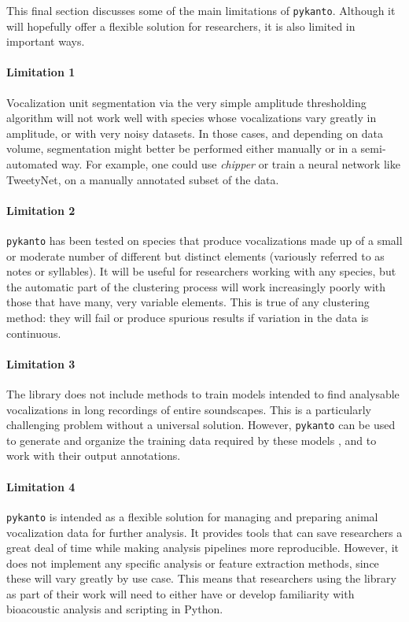 This final section discusses some of the main limitations of \texttt{pykanto}. Although it
will hopefully offer a flexible solution for researchers, it is also limited in
important ways.

\paragraph{Limitation 1} Vocalization unit segmentation via the very simple amplitude
thresholding algorithm will not work well with species whose vocalizations vary
greatly in amplitude, or with very noisy datasets. In those cases, and depending
on data volume,  segmentation might better be performed either manually or in a
semi-automated way. For example, one could use \textit{chipper}
\parencite{searfoss2020a} or train a neural network like TweetyNet,
\parencite{cohen2022} on a manually annotated subset of the data.

\paragraph{Limitation 2} \texttt{pykanto} has been tested on species that produce
vocalizations made up of a small or moderate number of different but distinct
elements (variously referred to as notes or syllables). It will be useful for
researchers working with any species, but the automatic part of the clustering
process will work increasingly poorly with those that have many, very variable elements. This is true of any clustering method: they will fail or
produce spurious results if variation in the data is continuous.

\paragraph{Limitation 3} The library does not include methods to train models intended to
find analysable vocalizations in long recordings of entire soundscapes. This is
a particularly challenging problem \parencite{priyadarshani2018} without a universal
solution. However, \texttt{pykanto} can be used to generate and organize the training
data required by these models \parencite{kahl2021, stowell2019, stowell2014}, and to
work with their output annotations.

\paragraph{Limitation 4} \texttt{pykanto} is intended as a flexible solution for managing
and preparing animal vocalization data for further analysis. It provides tools
that can save researchers a great deal of time while making analysis pipelines
more reproducible. However, it does not implement any specific analysis or
feature extraction methods, since these will vary greatly by use case. This
means that researchers using the library as part of their work will need to
either have or develop familiarity with bioacoustic analysis and scripting in
Python.

